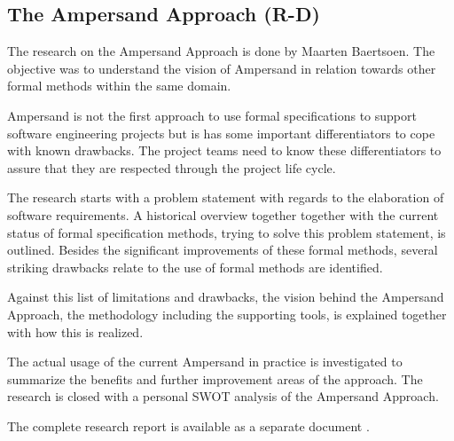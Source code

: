 

\subsection{The Ampersand Approach (R-D)}
\label{domain:approach}
The research on the Ampersand Approach is done by Maarten Baertsoen.
The objective was to understand the vision of Ampersand in relation towards other formal methods within the same domain.

Ampersand is not the first approach to use formal specifications to support software engineering projects but is has some important differentiators to cope with known drawbacks.
The project teams need to know these differentiators to assure that they are respected through the project life cycle.

The research starts with a problem statement with regards to the elaboration of software requirements.
A historical overview together together with the current status of formal specification methods, trying to solve this problem statement, is outlined.
Besides the significant improvements of these formal methods, several striking drawbacks relate to the use of formal methods are identified.

Against this list of limitations and drawbacks, the vision behind the Ampersand Approach, the methodology including the supporting tools, is explained together with how this is realized.

The actual usage of the current Ampersand in practice is investigated to summarize the benefits and further improvement areas of the approach.
The research is closed with a personal SWOT analysis of the Ampersand Approach.

The complete research report is available as a separate document .
